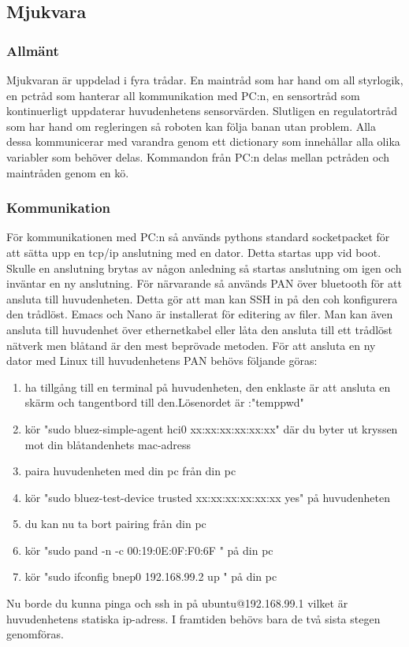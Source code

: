 \subsection{Mjukvara}
\subsubsection{Allmänt}
Mjukvaran är uppdelad i fyra trådar. En maintråd som har hand om all styrlogik, en pctråd som hanterar all kommunikation med PC:n, en sensortråd som kontinuerligt uppdaterar huvudenhetens sensorvärden. Slutligen en regulatortråd som har hand om regleringen så roboten kan följa banan utan problem. Alla dessa kommunicerar med varandra genom ett dictionary som innehållar alla olika variabler som behöver delas. Kommandon från PC:n delas mellan pctråden och maintråden genom en kö.
\subsubsection{Kommunikation}
För kommunikationen med PC:n så används pythons standard socketpacket för att sätta upp en tcp/ip anslutning med en dator. Detta startas upp vid boot. Skulle en anslutning brytas av någon anledning så startas anslutning om igen och inväntar en ny anslutning. För närvarande så används PAN över bluetooth för att ansluta till huvudenheten. Detta gör att man kan SSH in på den coh konfigurera den trådlöst. Emacs och Nano är installerat för editering av filer. Man kan även ansluta till huvudenhet över ethernetkabel eller låta den ansluta till ett trådlöst nätverk men blåtand är den mest beprövade metoden. För att ansluta en ny dator med Linux till huvudenhetens PAN behövs följande göras:
\begin{enumerate}
\item ha tillgång till en terminal på huvudenheten, den enklaste är att ansluta en skärm och tangentbord till den.\newline Lösenordet är :"temppwd"
\item kör "sudo bluez-simple-agent hci0 xx:xx:xx:xx:xx:xx" där du byter ut kryssen mot din blåtandenhets mac-adress
\item paira huvudenheten med din pc från din pc
\item  kör "sudo bluez-test-device trusted xx:xx:xx:xx:xx:xx yes" på huvudenheten
\item du kan nu ta bort pairing från din pc
\item kör "sudo pand -n -c 00:19:0E:0F:F0:6F	" på din pc
\item kör "sudo ifconfig bnep0 192.168.99.2 up " på din pc
\end{enumerate}
Nu borde du kunna pinga och ssh in på ubuntu@192.168.99.1 vilket är huvudenhetens statiska ip-adress. I framtiden behövs bara de två sista stegen genomföras.

